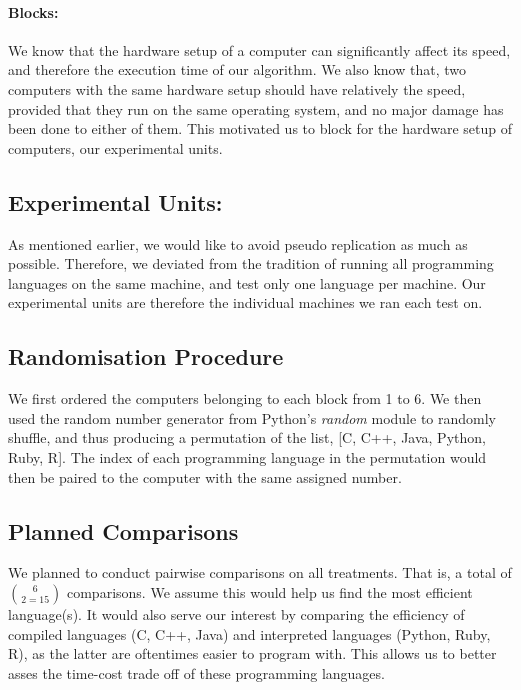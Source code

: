 \documentclass[12pt,halfline,a4paper,]{ouparticle}
\begin{document}
\paragraph{Blocks:}\label{blocks}

We know that the hardware setup of a computer can significantly affect
its speed, and therefore the execution time of our algorithm. We also
know that, two computers with the same hardware setup should have
relatively the speed, provided that they run on the same operating
system, and no major damage has been done to either of them. This
motivated us to block for the hardware setup of computers, our
experimental units.

\subsection{Experimental Units:}\label{experimental-units}

As mentioned earlier, we would like to avoid pseudo replication as much
as possible. Therefore, we deviated from the tradition of running all
programming languages on the same machine, and test only one language
per machine. Our experimental units are therefore the individual
machines we ran each test on.

\subsection{Randomisation Procedure}\label{randomisation-procedure}

We first ordered the computers belonging to each block from 1 to 6. We
then used the random number generator from Python's \emph{random} module
to randomly shuffle, and thus producing a permutation of the list, {[}C,
C++, Java, Python, Ruby, R{]}. The index of each programming language in
the permutation would then be paired to the computer with the same
assigned number.

\subsection{Planned Comparisons}\label{planned-comparisons}

We planned to conduct pairwise comparisons on all treatments. That is, a
total of \(6 \choose 2 = 15\) comparisons. We assume this would help us
find the most efficient language(s). It would also serve our interest by
comparing the efficiency of compiled languages (C, C++, Java) and
interpreted languages (Python, Ruby, R), as the latter are oftentimes
easier to program with. This allows us to better asses the time-cost
trade off of these programming languages.
\end{document}
